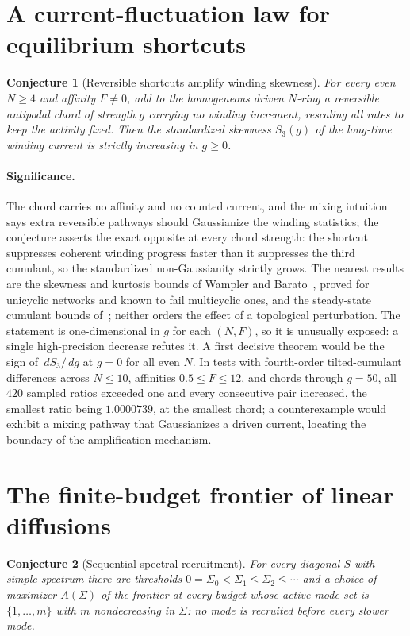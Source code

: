 \documentclass[11pt]{article}
\newtheorem{conjecture}{Conjecture}
\theoremstyle{definition}
\newcommand{\dd}{\,d}
\begin{document}
\section{A current-fluctuation law for equilibrium shortcuts}

\begin{conjecture}[Reversible shortcuts amplify winding skewness]\label{ag1}
For every even $N\ge4$ and affinity $F\ne0$, add to the homogeneous driven $N$-ring a reversible antipodal chord of strength $g$ carrying no winding increment, rescaling all rates to keep the activity fixed.  Then the standardized skewness $S_3(g)$ of the long-time winding current is strictly increasing in $g\ge0$.
\end{conjecture}

\paragraph{Significance.}
The chord carries no affinity and no counted current, and the mixing intuition says extra reversible pathways should Gaussianize the winding statistics; the conjecture asserts the exact opposite at every chord strength: the shortcut suppresses coherent winding progress faster than it suppresses the third cumulant, so the standardized non-Gaussianity strictly grows.  The nearest results are the skewness and kurtosis bounds of Wampler and Barato~\cite{WB22}, proved for unicyclic networks and known to fail multicyclic ones, and the steady-state cumulant bounds of~\cite{Pta22}; neither orders the effect of a topological perturbation.  The statement is one-dimensional in $g$ for each $(N,F)$, so it is unusually exposed: a single high-precision decrease refutes it.  A first decisive theorem would be the sign of $\dd S_3/\dd g$ at $g=0$ for all even $N$.  In tests with fourth-order tilted-cumulant differences across $N\le10$, affinities $0.5\le F\le12$, and chords through $g=50$, all $420$ sampled ratios exceeded one and every consecutive pair increased, the smallest ratio being $1.0000739$, at the smallest chord; a counterexample would exhibit a mixing pathway that Gaussianizes a driven current, locating the boundary of the amplification mechanism.

\section{The finite-budget frontier of linear diffusions}

\begin{conjecture}[Sequential spectral recruitment]\label{ag2}
For every diagonal $S$ with simple spectrum there are thresholds $0=\Sigma_0<\Sigma_1\le\Sigma_2\le\cdots$ and a choice of maximizer $A(\Sigma)$ of the frontier at every budget whose active-mode set is $\{1,\ldots,m\}$ with $m$ nondecreasing in $\Sigma$: no mode is recruited before every slower mode.
\end{conjecture}
\end{document}
